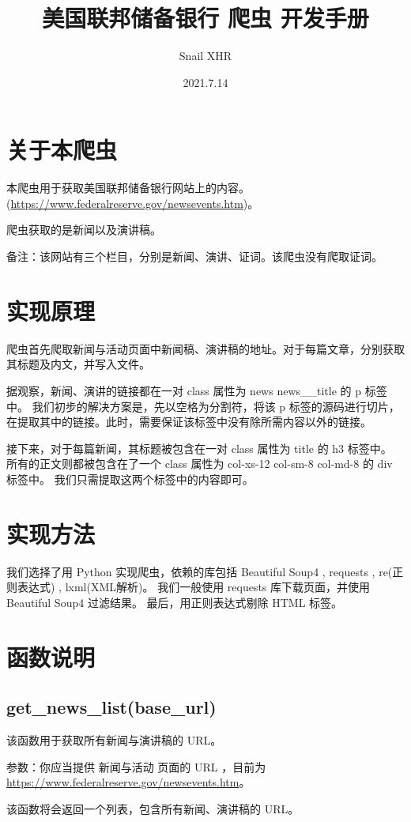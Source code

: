 \documentclass{article}
\title{美国联邦储备银行 爬虫 开发手册}
\author{Snail XHR}
\date{2021.7.14}
\begin{document}
    \maketitle
    \newpage
    \renewcommand{\contentsname}{目录}
    \tableofcontents
    \newpage
    \noindent\section{关于本爬虫}
    本爬虫用于获取美国联邦储备银行网站上的内容。
    (\url{https://www.federalreserve.gov/newsevents.htm})。
    \par
    爬虫获取的是新闻以及演讲稿。
    \par
    备注：该网站有三个栏目，分别是新闻、演讲、证词。该爬虫没有爬取证词。 
    
    \noindent\section{实现原理}
    爬虫首先爬取新闻与活动页面中新闻稿、演讲稿的地址。对于每篇文章，分别获取其标题及内文，并写入文件。
    \par
    据观察，新闻、演讲的链接都在一对 class 属性为 news news\_\_title 的 p 标签中。
    我们初步的解决方案是，先以空格为分割符，将该 p 标签的源码进行切片，在提取其中的链接。此时，需要保证该标签中没有除所需内容以外的链接。
    
    \par
    接下来，对于每篇新闻，其标题被包含在一对 class 属性为 title 的 h3 标签中。
    所有的正文则都被包含在了一个 class 属性为 col-xs-12  col-sm-8  col-md-8 的 div 标签中。
    我们只需提取这两个标签中的内容即可。
    \noindent\section{实现方法}
    我们选择了用 Python 实现爬虫，依赖的库包括 Beautiful Soup4 , requests , re(正则表达式) , lxml(XML解析)。
    我们一般使用 requests 库下载页面，并使用 Beautiful Soup4 过滤结果。
    最后，用正则表达式剔除 HTML 标签。
    \noindent\section{函数说明}
    \subsection{get\_news\_list(base\_url)}
    该函数用于获取所有新闻与演讲稿的 URL。
    \par
    参数：你应当提供 新闻与活动 页面的 URL ，目前为
    \url{https://www.federalreserve.gov/newsevents.htm}。
    \par
    该函数将会返回一个列表，包含所有新闻、演讲稿的 URL。
\end{document}
